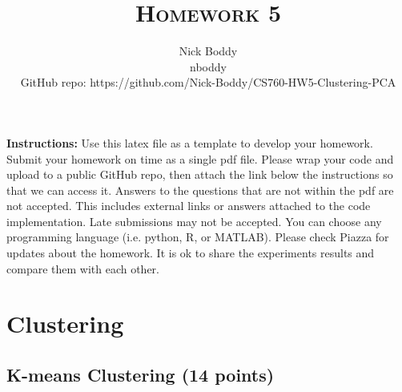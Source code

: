 \documentclass[a4paper]{article}
\title{\textsc{Homework 5}} %
\author{
Nick Boddy \\
nboddy \\
GitHub repo: https://github.com/Nick-Boddy/CS760-HW5-Clustering-PCA \\
}
\date{}
\theoremstyle{definition}
\begin{document}
\maketitle 


\textbf{Instructions:}
Use this latex file as a template to develop your homework. Submit your homework on time as a single pdf file. Please wrap your code and upload to a public GitHub repo, then attach the link below the instructions so that we can access it. Answers to the questions that are not within the pdf are not accepted. This includes external links or answers attached to the code implementation. Late submissions may not be accepted. You can choose any programming language (i.e. python, R, or MATLAB). Please check Piazza for updates about the homework. It is ok to share the experiments results and compare them with each other.

\vspace{0.1in}


\section{Clustering}

\subsection{K-means Clustering (14 points)}
\end{document}
